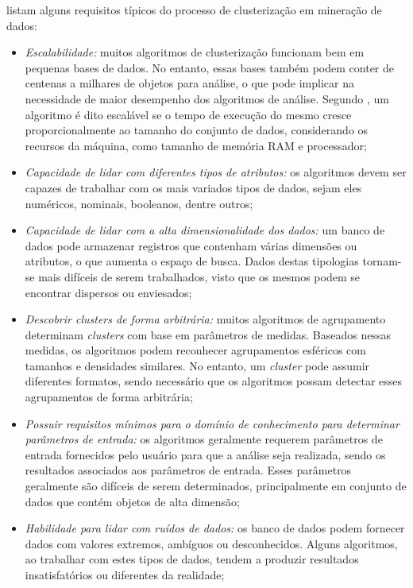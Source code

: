\citet{han_kamber2006} listam alguns requisitos típicos do processo de clusterização em mineração de dados:
\begin{itemize}
\item \textit{Escalabilidade:} muitos algoritmos de clusterização funcionam bem em pequenas bases de dados. No entanto, essas bases também podem conter de centenas a milhares de objetos para análise, o que pode implicar na necessidade de maior desempenho dos algoritmos de análise. Segundo \citet{palmeira_santos2014}, um algoritmo é dito escalável se o tempo de execução do mesmo cresce proporcionalmente ao tamanho do conjunto de dados, considerando os recursos da máquina, como tamanho de memória RAM e processador;

\item \textit{Capacidade de lidar com diferentes tipos de atributos:} os algoritmos devem ser capazes de trabalhar com os mais variados tipos de dados, sejam eles numéricos, nominais, booleanos, dentre outros;

\item \textit{Capacidade de lidar com a alta dimensionalidade dos dados:} um banco de dados pode armazenar registros que contenham várias dimensões ou atributos, o que aumenta o espaço de busca. Dados destas tipologias tornam-se mais difíceis de serem trabalhados, visto que os mesmos podem se encontrar dispersos ou enviesados;

\item \textit{Descobrir \textit{clusters} de forma arbitrária:} muitos algoritmos de agrupamento determinam \textit{clusters} com base em parâmetros de medidas. Baseados nessas medidas, os algoritmos podem reconhecer agrupamentos esféricos com tamanhos e densidades similares. No entanto, um \textit{cluster} pode assumir diferentes formatos, sendo necessário que os algoritmos possam detectar esses agrupamentos de forma arbitrária;

\item \textit{Possuir requisitos mínimos para o domínio de conhecimento para determinar parâmetros de entrada:} os algoritmos geralmente requerem parâmetros de entrada fornecidos pelo usuário para que a análise seja realizada, sendo os resultados  associados aos parâmetros de entrada. Esses parâmetros geralmente são difíceis de serem determinados, principalmente em conjunto de dados que contém objetos de alta dimensão;

\item \textit {Habilidade para lidar com ruídos de dados:} os banco de dados podem fornecer dados com valores extremos, ambíguos ou desconhecidos. Alguns algoritmos, ao trabalhar com estes tipos de dados, tendem a produzir resultados insatisfatórios ou diferentes da realidade;


\end{itemize}
